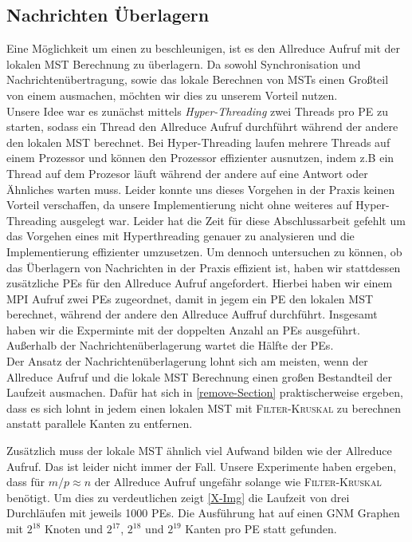 \subsection{Nachrichten Überlagern}
Eine Möglichkeit um einen \boruvkaStep zu beschleunigen, ist es den Allreduce Aufruf mit der lokalen MST Berechnung zu überlagern. Da sowohl Synchronisation und Nachrichtenübertragung, sowie das lokale Berechnen von MSTs einen Großteil von einem \boruvkaStep ausmachen, möchten wir dies zu unserem Vorteil nutzen.\\
Unsere Idee war es zunächst mittels \emph{Hyper-Threading} zwei Threads pro PE zu starten, sodass ein Thread den Allreduce Aufruf durchführt während der andere den lokalen MST berechnet. Bei Hyper-Threading laufen mehrere Threads auf einem Prozessor und können den Prozessor effizienter ausnutzen, indem z.B ein Thread auf dem Prozesor läuft während der andere auf eine Antwort oder Ähnliches warten muss.
Leider konnte uns dieses Vorgehen in der Praxis keinen Vorteil verschaffen, da unsere Implementierung nicht ohne weiteres auf Hyper-Threading ausgelegt war.
Leider hat die Zeit für diese Abschlussarbeit gefehlt um das Vorgehen eines \boruvkaStep mit Hyperthreading genauer zu analysieren und die Implementierung effizienter umzusetzen. Um dennoch untersuchen zu können, ob das Überlagern von Nachrichten in der Praxis effizient ist, haben wir stattdessen zusätzliche PEs für den Allreduce Aufruf angefordert. Hierbei haben wir einem MPI Aufruf zwei PEs zugeordnet, damit in jegem \boruvkaStep ein PE den lokalen MST berechnet, während der andere den Allreduce Auffruf durchführt. Insgesamt haben wir die Experminte mit der doppelten Anzahl an PEs ausgeführt.
Außerhalb der Nachrichtenüberlagerung wartet die Hälfte der PEs.\\

Der Ansatz der Nachrichtenüberlagerung lohnt sich am meisten, wenn der Allreduce Aufruf und die lokale MST Berechnung einen großen Bestandteil der Laufzeit ausmachen.
Dafür hat sich in \cref{remove-Section} praktischerweise ergeben, dass es sich lohnt in jedem \boruvkaStep einen lokalen MST mit \textsc{Filter-Kruskal} zu berechnen anstatt parallele Kanten zu entfernen. 
 
Zusätzlich muss der lokale MST ähnlich viel Aufwand bilden wie der Allreduce Aufruf. Das ist leider nicht immer der Fall. Unsere Experimente haben ergeben, dass für $m/p \approx n$ der Allreduce Aufruf ungefähr solange wie \textsc{Filter-Kruskal} benötigt. Um dies zu verdeutlichen zeigt \cref{X-Img} die Laufzeit von drei \boruvkaAllreduce Durchläufen mit jeweils 1000 PEs. Die Ausführung hat auf einen GNM Graphen mit $2^{18}$ Knoten und $2^{17}$, $2^{18}$ und $2^{19}$ Kanten pro PE statt gefunden.


